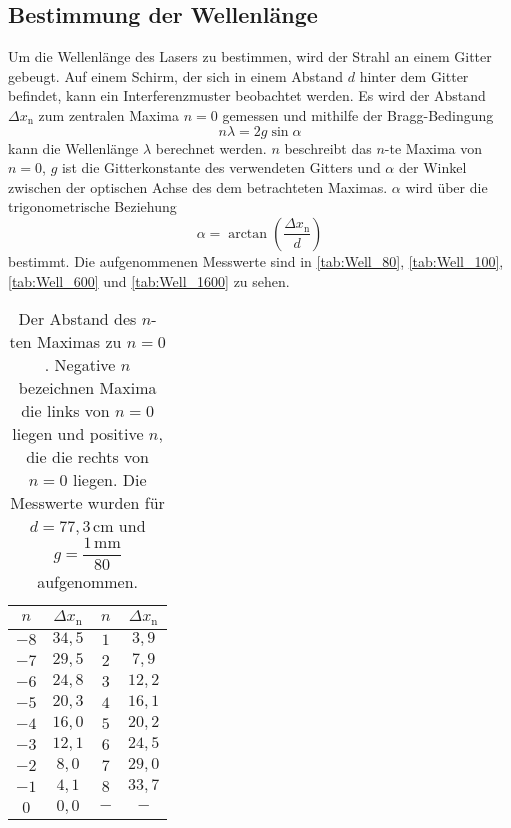\subsection{Bestimmung der Wellenlänge}
\label{sec:Wellenlänge}

Um die Wellenlänge des Lasers zu bestimmen, wird der Strahl an einem Gitter gebeugt. Auf einem Schirm, der sich in einem Abstand $d$ hinter dem Gitter befindet, kann ein Interferenzmuster beobachtet werden. Es wird der Abstand $\Delta x_\text{n}$ zum zentralen Maxima $n = 0$ gemessen und mithilfe der Bragg-Bedingung
\begin{equation}
    n \lambda = 2 g \sin{\alpha}
    \label{eq:bragg}
\end{equation}
kann die Wellenlänge $\lambda$ berechnet werden. $n$  beschreibt das $n$-te Maxima von $n=0$, $g$ ist die Gitterkonstante des verwendeten Gitters und $\alpha$ der Winkel zwischen der optischen Achse des dem betrachteten Maximas.
$\alpha$ wird über die trigonometrische Beziehung  
\begin{equation}
    \alpha = \arctan(\frac{\Delta x_\text{n}}{d})
    \label{eq:trig}
\end{equation} 
bestimmt. Die aufgenommenen Messwerte sind in \autoref{tab:Well_80}, \autoref{tab:Well_100}, \autoref{tab:Well_600} und \autoref{tab:Well_1600} zu sehen.

\begin{table}[H]
    \centering
    \caption{Der Abstand des $n$-ten Maximas zu $n = 0$. Negative $n$ bezeichnen Maxima die links von $n = 0$ liegen und positive $n$, die die rechts von $n = 0$ liegen. Die Messwerte wurden für $d = 77,3 \, \unit{\centi\meter}$ und $g = \dfrac{1 \, \unit{\milli\meter}}{80}$ aufgenommen.}
    \label{tab:Well_80}
    \begin{tabular}{c c c c}
    \toprule
     $n$ & $\Delta x_\text{n}$ &   $n$ & $\Delta x_\text{n}$\\
    \midrule
        $-8$  &$ 34,5$ &        $1$ &  $ 3,9$ \\
        $-7$  &$ 29,5$ &        $2$ &  $ 7,9$ \\
        $-6$  &$ 24,8$ &        $3$ &  $12,2$ \\
        $-5$  &$ 20,3$ &        $4$ &  $16,1$ \\
        $-4$  &$ 16,0$ &        $5$ &  $20,2$ \\
        $-3$  &$ 12,1$ &        $6$ &  $24,5$ \\
        $-2$  &$ 8,0 $ &        $7$ &  $29,0$ \\
        $-1$  &$ 4,1 $ &        $8$ &  $33,7$ \\
       $ 0 $  &$ 0,0 $ &        $-$ &  $   -$ \\
    \bottomrule
    \end{tabular}
    \end{table}


